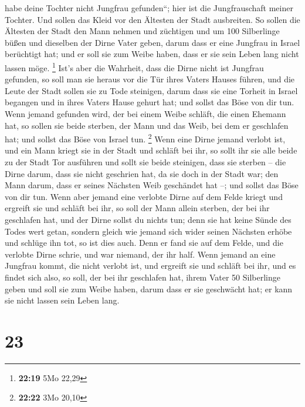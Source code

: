 habe deine Tochter nicht Jungfrau gefunden``; hier ist die
Jungfrauschaft meiner Tochter. Und sollen das Kleid vor den Ältesten der
Stadt ausbreiten.  So sollen die Ältesten der Stadt den
Mann nehmen und züchtigen  und um 100 Silberlinge büßen
und dieselben der Dirne Vater geben, darum dass er eine Jungfrau in
Israel berüchtigt hat; und er soll sie zum Weibe haben, dass er sie sein
Leben lang nicht lassen möge. \footnote{\textbf{22:19} 5Mo 22,29}
 Ist's aber die Wahrheit, dass die Dirne nicht ist
Jungfrau gefunden,  so soll man sie heraus vor die Tür
ihres Vaters Hauses führen, und die Leute der Stadt sollen sie zu Tode
steinigen, darum dass sie eine Torheit in Israel begangen und in ihres
Vaters Hause gehurt hat; und sollst das Böse von dir tun.
 Wenn jemand gefunden wird, der bei einem Weibe schläft,
die einen Ehemann hat, so sollen sie beide sterben, der Mann und das
Weib, bei dem er geschlafen hat; und sollst das Böse von Israel tun.
\footnote{\textbf{22:22} 3Mo 20,10}  Wenn eine Dirne
jemand verlobt ist, und ein Mann kriegt sie in der Stadt und schläft bei
ihr,  so sollt ihr sie alle beide zu der Stadt Tor
ausführen und sollt sie beide steinigen, dass sie sterben -- die Dirne
darum, dass sie nicht geschrien hat, da sie doch in der Stadt war; den
Mann darum, dass er seines Nächsten Weib geschändet hat --; und sollst
das Böse von dir tun.  Wenn aber jemand eine verlobte
Dirne auf dem Felde kriegt und ergreift sie und schläft bei ihr, so soll
der Mann allein sterben, der bei ihr geschlafen hat,  und
der Dirne sollst du nichts tun; denn sie hat keine Sünde des Todes wert
getan, sondern gleich wie jemand sich wider seinen Nächsten erhöbe und
schlüge ihn tot, so ist dies auch.  Denn er fand sie auf
dem Felde, und die verlobte Dirne schrie, und war niemand, der ihr half.
 Wenn jemand an eine Jungfrau kommt, die nicht verlobt
ist, und ergreift sie und schläft bei ihr, und es findet sich also,
 so soll, der bei ihr geschlafen hat, ihrem Vater 50
Silberlinge geben und soll sie zum Weibe haben, darum dass er sie
geschwächt hat; er kann sie nicht lassen sein Leben lang.

\hypertarget{section-22}{%
\section{23}\label{section-22}}

